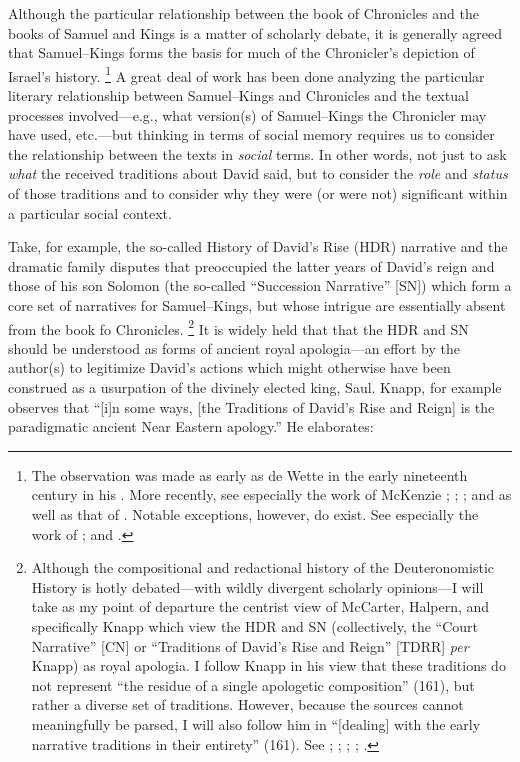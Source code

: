 Although the particular relationship between the book of Chronicles and the books of Samuel and Kings is a matter of scholarly debate, it is generally agreed that Samuel--Kings forms the basis for much of the Chronicler's depiction of Israel's history.%
    \footnote{The observation was made as early as de Wette in the early nineteenth century in his \cite*{dewette1806}. More recently, see especially the work of McKenzie
        \cite*{mckenzie1985};
        \cite{mckenzie_graham-mckenzie1999};
        \cite[66--71]{knoppers2003}; and 
        \cite[30--42]{klein2006} as well as that of 
        \cite[74--74]{carr2011}. Notable exceptions, however, do exist. See especially the work of 
        \cite{auld1994}; 
        \cite{auld_graham-mckenzie1999} and 
        \cite{person2010}.}
A great deal of work has been done analyzing the particular literary relationship between Samuel--Kings and Chronicles and the textual processes involved---e.g., what version(s) of Samuel--Kings the Chronicler may have used, etc.---but thinking in terms of social memory requires us to consider the relationship between the texts in \emph{social} terms. In other words, not just to ask \emph{what} the received traditions about David said, but to consider the \emph{role} and \emph{status} of those traditions and to consider why they were (or were not) significant within a particular social context.

Take, for example, the so-called History of David's Rise (HDR) narrative  and the dramatic family disputes that preoccupied the latter
years of David's reign and those of his son Solomon (the so-called ``Succession Narrative'' [SN]) which form a core set of narratives for Samuel--Kings, but whose intrigue are essentially absent from the book fo Chronicles.%
    \footnote{Although the compositional and redactional history of the Deuteronomistic History is hotly debated---with wildly divergent scholarly opinions---I will take as my point of departure the centrist view of McCarter, Halpern, and specifically Knapp which view the HDR and SN (collectively, the ``Court Narrative'' [CN] or ``Traditions of David's Rise and Reign'' [TDRR] \emph{per} Knapp) as royal apologia. I follow Knapp in his view that these traditions do not represent ``the residue of a single apologetic composition'' (161), but rather a diverse set of traditions. However, because the sources cannot meaningfully be parsed, I will also follow him in ``[dealing] with the early narrative traditions in their entirety'' (161). See 
        \cite{knapp2015};
        \cite{mccarter_interpretation1981};
        \cite{mccarter_jbl1980};
        \cite{mccarter1980};
        \cite{halpern2001}.}
It is widely held that that the HDR and SN should be understood as forms of ancient royal apologia---an effort by the author(s) to legitimize David's actions which might otherwise have been construed as a usurpation of the divinely elected king, Saul. Knapp, for example observes that ``[i]n some ways, [the Traditions of David's Rise and Reign] is the paradigmatic ancient Near Eastern apology.''%
    \autocite[218]{knapp2015}
He elaborates:

